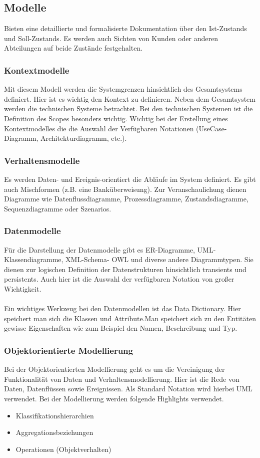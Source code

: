 \subsection{Modelle}
Bieten eine detaillierte und formalisierte Dokumentation über den Ist-Zustands und Soll-Zustands. Es werden auch Sichten von Kunden oder anderen Abteilungen auf beide Zustände festgehalten. 
\subsubsection{Kontextmodelle}
Mit diesem Modell werden die Systemgrenzen hinsichtlich des Gesamtsystems definiert. Hier ist es wichtig den Kontext zu definieren. Neben dem Gesamtsystem werden die technischen Systeme betrachtet. Bei den technischen Systemen ist die Definition des Scopes besonders wichtig. Wichtig bei der Erstellung eines Kontextmodelles die die Auswahl der Verfügbaren Notationen (UseCase-Diagramm, Architekturdiagramm, etc.).

\subsubsection{Verhaltensmodelle}
Es werden Daten- und Ereignis-orientiert die Abläufe im System definiert. Es gibt auch Mischformen (z.B. eine Banküberweisung). Zur Veranschaulichung dienen Diagramme wie Datenflussdiagramme, Prozessdiagramme, Zustandsdiagramme, Sequenzdiagramme oder Szenarios. 

\subsubsection{Datenmodelle}
Für die Darstellung der Datenmodelle gibt es ER-Diagramme, UML-Klassendiagramme, XML-Schema- OWL und diverse andere Diagrammtypen. Sie dienen zur logischen Definition der Datenstrukturen hinsichtlich transients und persistents. Auch hier ist die Auswahl der verfügbaren Notation von großer 
Wichtigkeit.
\\\\
Ein wichtiges Werkzeug bei den Datenmodellen ist das Data Dictionary. Hier speichert man sich die Klassen und Attribute.Man speichert sich zu den Entitäten gewisse Eigenschaften wie zum Beispiel den Namen, Beschreibung und Typ.

\subsubsection{Objektorientierte Modellierung}
Bei der Objektorientierten Modellierung geht es um die Vereinigung der Funktionalität von Daten und Verhaltensmodellierung. Hier ist die Rede von Daten, Datenflüssen sowie Ereignissen. Als Standard Notation wird hierbei UML verwendet. Bei der Modellierung werden folgende Highlights verwendet.
\begin{itemize}
\item Klassifikationshierarchien
\item Aggregationsbeziehungen
\item Operationen (Objektverhalten)
\end{itemize}

